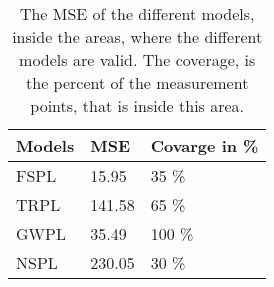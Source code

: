 


\begin{table}[!htbp]
\centering
\begin{tabular}{|l|l|l|}
\hline
\textbf{Models} & \textbf{MSE} & \textbf{Covarge in \%} \\ \hline
FSPL            & 15.95        & 35 \%                  \\ \hline
TRPL 		    & 141.58       & 65 \%                  \\ \hline %
GWPL            & 35.49        & 100 \%                 \\ \hline
NSPL            & 230.05       & 30 \%                  \\ \hline
\end{tabular}
\caption{The MSE of the different models, inside the areas, where the different models are valid. The coverage, is the percent of the measurement points, that is inside this area.}
\label{model_comparison}
\end{table}





